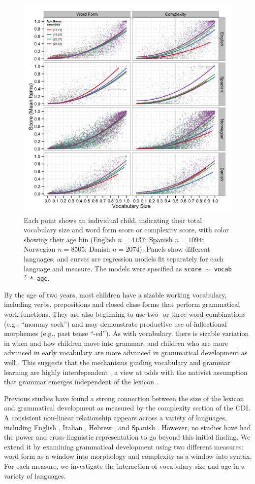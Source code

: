 \documentclass[10pt,letterpaper]{article}
\begin{document}
\begin{figure}[tbh]
\begin{center}
\includegraphics[width=.75\textwidth]{plots/grammar.png}
\end{center}
\caption{\label{fig:grammar} Each point shows an individual child, indicating their total vocabulary size and word form score or complexity score, with color showing their age bin (English $n=4137$; Spanish $n=1094$; Norwegian $n=8505$; Danish $n=2074$). Panels show different languages, and curves are regression models fit separately for each language and measure. The models were specified as \small{\tt{score $\sim$ vocab$^{2}$ * age}}.} 
\end{figure}

By the age of two years, most children have a sizable working vocabulary, including verbs, prepositions and closed class forms that perform grammatical work functions. They are also beginning to use two- or three-word combinations (e.g., ``mommy sock'') and may demonstrate productive use of inflectional morphemes (e.g., past tense ``-ed''). As with vocabulary, there is sizable variation in when and how children move into grammar, and children who are more advanced in early vocabulary are more advanced in grammatical development as well \cite{bates1999}. This suggests that the mechanisms guiding vocabulary and grammar learning are highly interdependent \cite{tomasello2003,bresnan2001}, a view at odds with the nativist assumption that grammar emerges independent of the lexicon \cite{chomsky1981}.

Previous studies have found a strong connection between the size of the lexicon and grammatical development as measured by the complexity section of the CDI. A consistent non-linear relationship appears across a variety of languages, including English \cite{bates1994,fenson1994}, Italian \cite{caselli1999}, Hebrew \cite{maital2000}, and Spanish \cite{jackson-maldonado2003}. However, no studies have had the power and cross-linguistic representation to go beyond this initial finding. We extend it by examining grammatical development using two different measures: word form as a window into morphology and complexity as a window into syntax. For each measure, we investigate the interaction of vocabulary size and age in a variety of languages.
\end{document}
